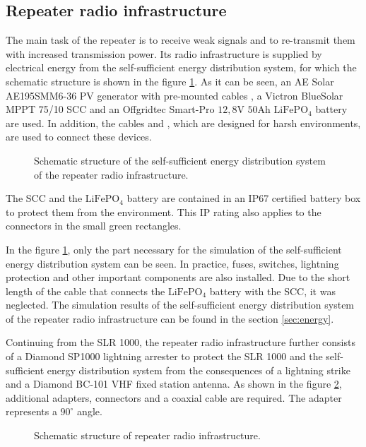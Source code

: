 \subsection{Repeater radio infrastructure}
The main task of the repeater is to receive weak signals and to re-transmit them with increased transmission power. Its radio infrastructure is supplied by electrical energy from the self-sufficient energy distribution system, for which the schematic structure is shown in the figure \ref{fig:tikz_rep_energy}. As it can be seen, an AE Solar AE195SMM6-36 PV generator with pre-mounted cables , a Victron BlueSolar MPPT 75/10 SCC and an Offgridtec Smart-Pro $12,8\mathrm{V}$ $50\mathrm{Ah}$ $\mathrm{LiFePO}_4$ battery are used. In addition, the cables  and , which are designed for harsh environments, are used to connect these devices.
\begin{figure}[h!]
	\centering
	
	\caption{Schematic structure of the self-sufficient energy distribution system of the repeater radio infrastructure.}
	\label{fig:tikz_rep_energy}
\end{figure}
The SCC and the $\mathrm{LiFePO}_4$ battery are contained in an IP67 certified battery box to protect them from the environment. This IP rating also applies to the connectors in the small green rectangles. 

In the figure \ref{fig:tikz_rep_energy}, only the part necessary for the simulation of the self-sufficient energy distribution system can be seen. In practice, fuses, switches, lightning protection and other important components are also installed. Due to the short length of the cable that connects the $\mathrm{LiFePO}_4$ battery with the SCC, it was neglected. The simulation results of the self-sufficient energy distribution system of the repeater radio infrastructure can be found in the section \ref{sec:energy}. 

Continuing from the SLR 1000, the repeater radio infrastructure further consists of a Diamond SP1000 lightning arrester to protect the SLR 1000 and the self-sufficient energy distribution system from the consequences of a lightning strike and a Diamond BC-101 VHF fixed station antenna. As shown in the figure \ref{fig:tikz_repeater}, additional adapters, connectors and a coaxial cable are required. The adapter  represents a $90^\circ$ angle.
\begin{figure}[h!]
	\centering
	
	\caption{Schematic structure of repeater radio infrastructure.}
	\label{fig:tikz_repeater}
\end{figure}

